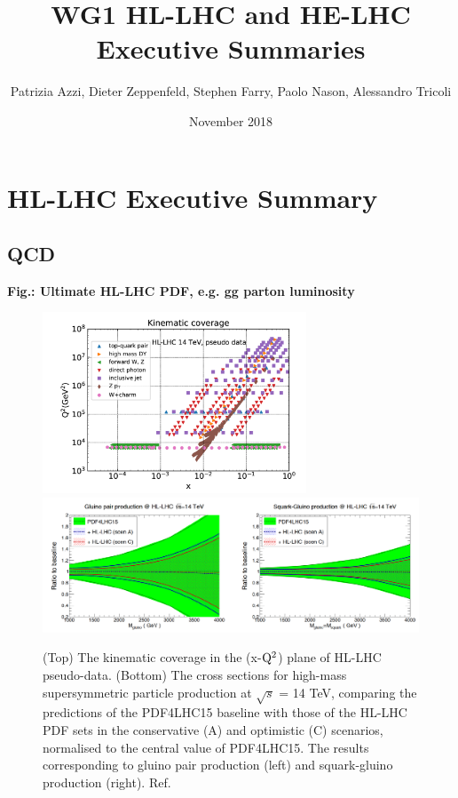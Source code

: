 \documentclass{article}
\title{WG1 HL-LHC and HE-LHC Executive Summaries}
\author{Patrizia Azzi, Dieter Zeppenfeld, Stephen Farry, Paolo Nason, Alessandro Tricoli }
\date{November 2018}
\begin{document}
\maketitle

\section{HL-LHC Executive Summary}


\subsection{QCD}

{\bf Fig.: Ultimate HL-LHC PDF, e.g. gg parton luminosity}


\begin{figure}
\centering
\includegraphics[width=0.7\textwidth]{HLLHC_kinematics.pdf}
\includegraphics[width=1.0\textwidth]{UltimatePDF_gluino_squark.pdf}
\caption{\label{Fig:HLLHC_kin} (Top) The kinematic coverage in the (x-${\rm Q^2}$) plane of HL-LHC pseudo-data. (Bottom) The cross sections for high-mass supersymmetric particle production at $\sqrt{s}$ = 14 TeV, comparing the predictions of the PDF4LHC15 baseline with those of the HL-LHC PDF sets in the conservative (A) and optimistic (C) scenarios, normalised to the central value of PDF4LHC15. The results corresponding to gluino pair production (left) and squark-gluino production (right). Ref.~\cite{Khalek:2018mdn}}
\end{figure}
\end{document}
